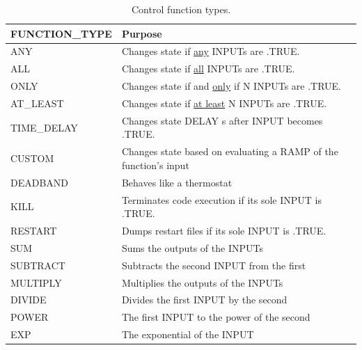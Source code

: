 \documentclass[11pt]{book}
\begin{document}
\begin{table}[h!]
\caption[Control function types]{Control function types.}
\label{tab:funcvalues}
\begin{center}
\begin{tabular}{|l||l|}
\hline
{\ct FUNCTION\_TYPE}              & Purpose   \\ \hline \hline
{\ct ANY}                         & Changes state if \underline{any} {\ct INPUT}s are {\ct .TRUE.}  \\ \hline
{\ct ALL}                         & Changes state if \underline{all} {\ct INPUT}s are {\ct .TRUE.}  \\ \hline
{\ct ONLY}                        & Changes state if and \underline{only} if {\ct N} {\ct INPUT}s are {\ct .TRUE.}  \\ \hline
{\ct AT\_LEAST}                   & Changes state if \underline{at least} {\ct N} {\ct INPUT}s are {\ct .TRUE.}  \\ \hline
{\ct TIME\_DELAY}                 & Changes state {\ct DELAY} s after {\ct INPUT} becomes {\ct .TRUE.} \\ \hline
{\ct CUSTOM}                      & Changes state based on evaluating a {\ct RAMP} of the function's input \\ \hline
{\ct DEADBAND}                    & Behaves like a thermostat  \\ \hline
{\ct KILL}                        & Terminates code execution if its sole {\ct INPUT} is {\ct .TRUE.}  \\ \hline
{\ct RESTART}                     & Dumps restart files if its sole {\ct INPUT} is {\ct .TRUE.} \\ \hline
{\ct SUM}                         & Sums the outputs of the {\ct INPUT}s \\ \hline
{\ct SUBTRACT}                    & Subtracts the second {\ct INPUT} from the first \\ \hline
{\ct MULTIPLY}                    & Multiplies the outputs of the {\ct INPUT}s \\ \hline
{\ct DIVIDE}                      & Divides the first {\ct INPUT} by the second \\ \hline
{\ct POWER}                       & The first {\ct INPUT} to the power of the second \\ \hline
{\ct EXP}                         & The exponential of the {\ct INPUT} \\ \hline

\end{tabular}
\end{center}
\end{table}
\end{document}
